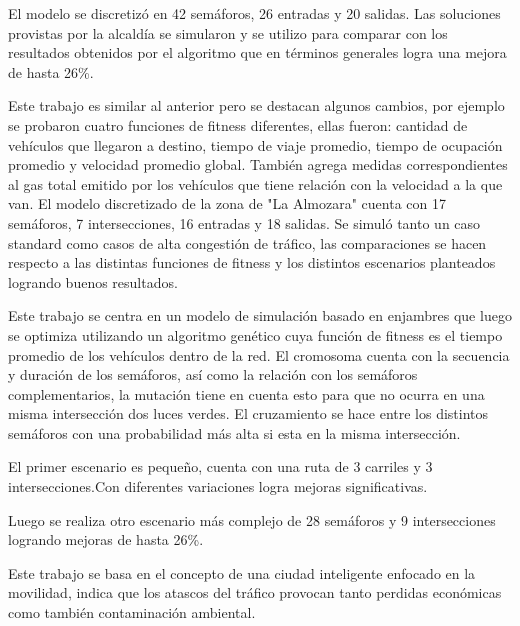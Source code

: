 \begin{itemize}
\begin{item}
		El modelo se discretizó en 42 semáforos, 26 entradas y 20 salidas.
		Las soluciones provistas por la alcaldía se simularon y se utilizo para comparar con los resultados obtenidos por el algoritmo que en términos generales logra una mejora de hasta 26\%.
		
	\end{item}
	
	\begin{item}
		Este trabajo es similar al anterior pero se destacan algunos cambios, por ejemplo se probaron cuatro funciones de fitness diferentes, ellas fueron: cantidad de vehículos que llegaron a destino, tiempo de viaje promedio, tiempo de ocupación promedio y velocidad promedio global.
		También agrega medidas correspondientes al gas total emitido por los vehículos que tiene relación con la velocidad a la que van.
		El modelo discretizado de la zona de "La Almozara" cuenta con 17 semáforos, 7 intersecciones, 16 entradas y 18 salidas.
		Se simuló tanto un caso standard como casos de alta congestión de tráfico, las comparaciones se hacen respecto a las distintas funciones de fitness y los distintos escenarios planteados logrando buenos resultados.
		
	\end{item}
	
	
	\begin{item}
		\bibentry{Penner2002}
		Este trabajo se centra en un modelo de simulación basado en enjambres que luego se optimiza utilizando un algoritmo genético cuya función de fitness es el tiempo promedio de los vehículos dentro de la red. El cromosoma cuenta con la secuencia y duración de los semáforos, así como la relación con los semáforos complementarios, la mutación tiene en cuenta esto para que no ocurra en una misma intersección dos luces verdes. El cruzamiento se hace entre los distintos semáforos con una probabilidad más alta si esta en la misma intersección.
		
		El primer escenario es pequeño, cuenta con una ruta de 3 carriles y 3 intersecciones.Con diferentes variaciones logra mejoras significativas.
		
		Luego se realiza otro escenario más complejo de 28 semáforos y 9 intersecciones logrando mejoras de hasta 26\%.
	\end{item}	
	
	
	\begin{item}
		\bibentry{Stolfi2012}
		Este trabajo se basa en el concepto de una ciudad inteligente enfocado en la movilidad, indica que los atascos del tráfico provocan tanto perdidas económicas como también contaminación ambiental.
		

\end{item}
\end{itemize}
